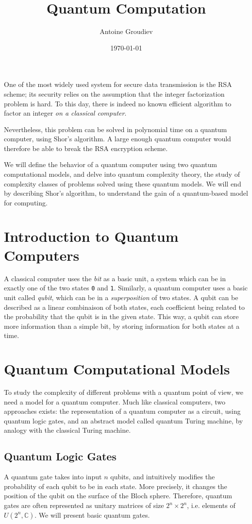 \documentclass[12pt,a4paper]{article}
\title{\vspace{-3ex} \textbf{Quantum Computation}}
\author{Antoine Groudiev}
\date{\vspace{-1ex}\today}
\begin{document}
\maketitle
One of the most widely used system for secure data transmission is the RSA scheme; its security relies on the assumption that the integer factorization problem is hard. To this day, there is indeed no known efficient algorithm to factor an integer \textit{on a classical computer}.

Nevertheless, this problem can be solved in polynomial time on a quantum computer, using Shor's algorithm. A large enough quantum computer would therefore be able to break the RSA encryption scheme.

We will define the behavior of a quantum computer using two quantum computational models, and delve into quantum complexity theory, the study of complexity classes of problems solved using these quantum models. We will end by describing Shor's algorithm, to understand the gain of a quantum-based model for computing.

\tableofcontents

\section*{Introduction to Quantum Computers}
A classical computer uses the \emph{bit} as a basic unit, a system which can be in exactly one of the two states \texttt{0} and \texttt{1}. Similarly, a quantum computer uses a basic unit called \emph{qubit}, which can be in a \emph{superposition} of two states. A qubit can be described as a linear combinaison of both states, each coefficient being related to the probability that the qubit is in the given state. This way, a qubit can store more information than a simple bit, by storing information for both states at a time.

\section{Quantum Computational Models}
To study the complexity of different problems with a quantum point of view, we need a model for a quantum computer. Much like classical computers, two approaches exists: the representation of a quantum computer as a circuit, using quantum logic gates, and an abstract model called quantum Turing machine, by analogy with the classical Turing machine.

\subsection{Quantum Logic Gates}
A quantum gate takes into input $n$ qubits, and intuitively modifies the probability of each qubit to be in each state. More precisely, it changes the position of the qubit on the surface of the Bloch sphere. Therefore, quantum gates are often represented as unitary matrices of size $2^n \times 2^n$, i.e. elements of $U(2^n, \mathbb{C})$. We will present basic quantum gates.
\end{document}
